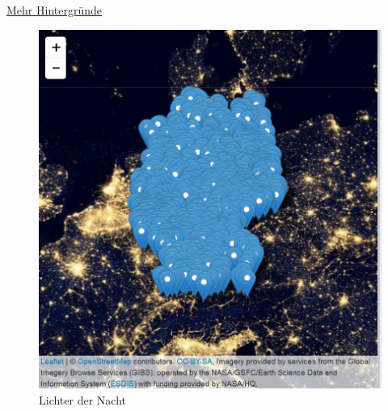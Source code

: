 \documentclass[ignorenonframetext,]{beamer}
\newenvironment{Shaded}{\begin{snugshade}}{\end{snugshade}}
\newcommand{\KeywordTok}[1]{\textcolor[rgb]{0.26,0.66,0.93}{\textbf{#1}}}
\newcommand{\NormalTok}[1]{\textcolor[rgb]{0.74,0.68,0.62}{#1}}
\newcommand{\OperatorTok}[1]{\textcolor[rgb]{0.74,0.68,0.62}{#1}}
\newcommand{\StringTok}[1]{\textcolor[rgb]{0.02,0.61,0.04}{#1}}
\begin{document}
\begin{frame}[fragile]{\href{http://leaflet-extras.github.io/leaflet-providers/preview/index.html}{Mehr
Hintergründe}}
\protect\hypertarget{mehr-hintergrunde}{}

\begin{Shaded}
\end{Shaded}

\begin{figure}
\centering
\includegraphics{figure/LightsInteractive.PNG}
\caption{Lichter der Nacht}
\end{figure}

\end{frame}
\end{document}
